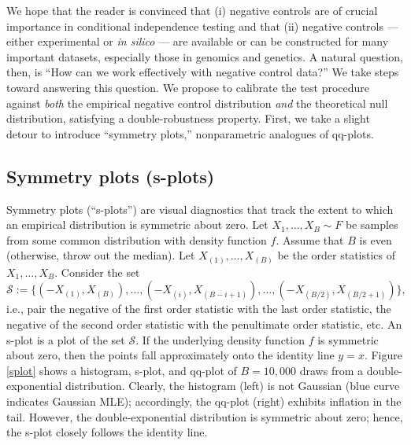 \documentclass[12pt]{article}
\begin{document}
We hope that the reader is convinced that (i) negative controls are of crucial importance in conditional independence testing and that (ii) negative controls --- either experimental or \textit{in silico} --- are available or can be constructed for many important datasets, especially those in genomics and genetics. A natural question, then, is ``How can we work effectively with negative control data?'' We take steps toward answering this question. We propose to calibrate the test procedure against \textit{both} the empirical negative control distribution \textit{and} the theoretical null distribution, satisfying a double-robustness property. First, we take a slight detour to introduce ``symmetry plots,'' nonparametric analogues of qq-plots.

\subsection{Symmetry plots (s-plots)}

Symmetry plots (``s-plots'') are visual diagnostics that track the extent to which an empirical distribution is symmetric about zero. Let $X_1, \dots, X_B \sim F$ be samples from some common distribution with density function $f$. Assume that $B$ is even (otherwise, throw out the median). Let $X_{(1)}, \dots, X_{(B)}$ be the order statistics of $X_1, \dots, X_B$. Consider the set
$$ \mathcal{S} := \{(-X_{(1)}, X_{(B)}), \dots, (-X_{(i)}, X_{(B - i +1)}), \dots, (-X_{(B/2)}, X_{(B/2 + 1)})\},$$ i.e., pair the negative of the first order statistic with the last order statistic, the negative of the second order statistic with the penultimate order statistic, etc. An s-plot is a plot of the set $\mathcal{S}.$ If the underlying density function $f$ is symmetric about zero, then the points fall approximately onto the identity line $y=x$. Figure \ref{splot} shows a histogram, s-plot, and qq-plot of $B=10,000$ draws from a double-exponential distribution. Clearly, the histogram (left) is not Gaussian (blue curve indicates Gaussian MLE); accordingly, the qq-plot (right) exhibits inflation in the tail. However, the double-exponential distribution is symmetric about zero; hence, the s-plot closely follows the identity line. 
\end{document}
